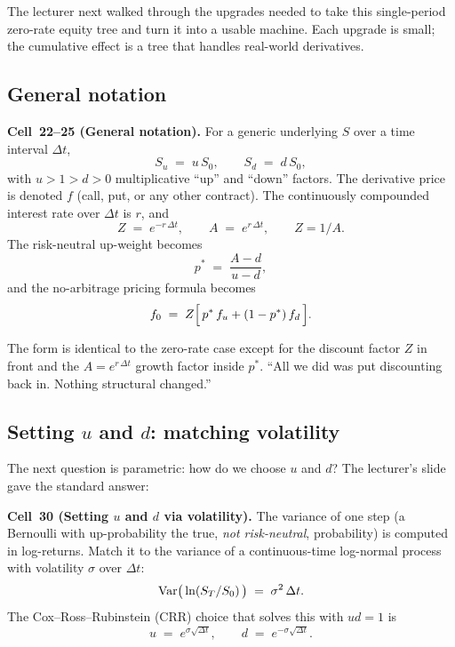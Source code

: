 The lecturer next walked through the upgrades needed to take this
single-period zero-rate equity tree and turn it into a usable
machine. Each upgrade is small; the cumulative effect is a tree
that handles real-world derivatives.

\subsection{General notation}\label{L8-sec:gennotation}

\begin{keyblock}
\textbf{Cell~22--25 (General notation).}
For a generic underlying $S$ over a time interval $\Delta t$,
\[
  S_u \;=\; u\,S_0,
  \qquad
  S_d \;=\; d\,S_0,
\]
with $u > 1 > d > 0$ multiplicative ``up'' and ``down'' factors. The
derivative price is denoted $f$ (call, put, or any other contract).
The continuously compounded interest rate over $\Delta t$ is $r$, and
\[
  Z \;=\; e^{-r\,\Delta t}, \qquad A \;=\; e^{r\,\Delta t}, \qquad Z = 1/A.
\]
The risk-neutral up-weight becomes
\[
  p^* \;=\; \frac{A - d}{u - d},
\]
and the no-arbitrage pricing formula becomes
\[
  f_0 \;=\; Z\Bigl[\,p^*\,f_u + (1 - p^*)\,f_d\,\Bigr].
\]
\end{keyblock}

The form is identical to the zero-rate case except for the discount
factor $Z$ in front and the $A = e^{r\,\Delta t}$ growth factor inside
$p^*$. ``All we did was put discounting back in. Nothing structural
changed.''

\subsection{Setting $u$ and $d$: matching volatility}\label{L8-sec:vol}

The next question is parametric: how do we choose $u$ and $d$? The
lecturer's slide gave the standard answer:

\begin{keyblock}
\textbf{Cell~30 (Setting $u$ and $d$ via volatility).}
The variance of one step (a Bernoulli with up-probability the true,
\emph{not risk-neutral}, probability) is computed in
log-returns. Match it to the variance of a continuous-time
log-normal process with volatility $\sigma$ over $\Delta t$:
\[
  \operatorname{Var}\bigl(\,\ln(S_T/S_0)\,\bigr) \;=\; \sigma^2 \,\Delta t.
\]
The Cox--Ross--Rubinstein (CRR) choice that solves this with
$ud = 1$ is
\[
  u \;=\; e^{\sigma\sqrt{\Delta t}},
  \qquad
  d \;=\; e^{-\sigma\sqrt{\Delta t}}.
\]
\end{keyblock}

